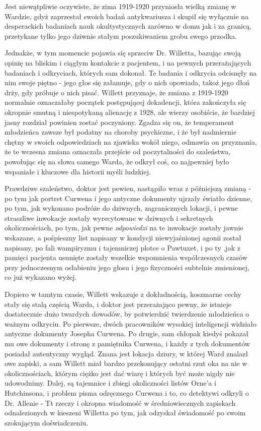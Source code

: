 Jest niewątpliwie oczywiste, że zima 1919-1920 przyniosła wielką zmianę w Wardzie, gdyż zaprzestał swoich badań antykwariusza i skupił się wyłącznie na desperackich badaniach nauk okultystycznych zarówno w domu jak i za granicą, przetykane tylko jego dziwnie stałym poszukiwaniem grobu swego przodka.

Jednakże, w tym momencie pojawia się sprzeciw Dr. Willetta, bazując swoją opinię na bliskim i ciągłym kontakcie z pacjentem, i na pewnych przerażających badaniach i odkryciach, których sam dokonał. Te badania i odkrycia odcisnęły na nim swoje piętno - jego głos się załamuje, gdy o nich opowiada, takoż jego dłoń drży, gdy próbuje o nich pisać. Willett przyznaje, że zmiana z 1919-1920 normalnie oznaczałaby początek postępującej dekadencji, która zakończyła się okropnie smutną i niespotykaną alienację z 1928, ale wierzy osobiście, że bardziej jasny rozdział powinien zostać poczyniony. Zgadza się on, że temperament młodzieńca zawsze był podatny na choroby psychiczne, i że był nadmiernie chętny w swoich odpowiedziach na zjawiska wokół niego, odmawia on przyznania, że te wczesna zmiana oznaczała przejście od poczytalności do szaleństwa, powołując się na słowa samego Warda, że odkrył coś, co najpewniej było wspaniałe i kluczowe dla historii myśli ludzkiej.

Prawdziwe szaleństwo, doktor jest pewien, nastąpiło wraz z późniejszą zmianą - po tym jak portret Curwena i jego antyczne dokumenty ujrzały światło dzienne, po tym, jak wykonano podróże do dziwnych, zagranicznych lokacji, i pewne straszliwe inwokacje zostały wyrecytowane w dziwnych i sekretnych okolicznościach, po tym, jak pewne \textit{odpowiedzi} na te inwokacje zostały jawnie wskazane, a pośpieszny list napisany w kondycji niewyjaśnionej agonii został napisany, po fali wampiryzmu i tajemniczej plotce o Pawtuxet, i po ty  ,jak z pamięci pacjenta usunięte zostały wszelkie wspomnienia współczesnych czasów  przy jednoczesnym osłabieniu jego głosu i jego fizyczności subtelnie zmienionej, co już wykazano wyżej.

Dopiero w tamtym czasie, Willett wskazuje z dokładnością, koszmarne cechy stały się stalą częścią Warda, i doktor jest przerażająco pewny, że istnieje dostatecznie dużo twardych dowodów, by potwierdzić twierdzenie młodzieńca o ważnym odkryciu. Po pierwsze, dwóch pracowników wysokiej inteligencji widziało antyczne dokumenty Josepha Curwena. Po drugie, sam chłopak kiedyś pokazał mu owe dokumenty i stronę z pamiętnika Curwena, i każdy z tych dokumentów posiadał autentyczny wygląd. Znana jest lokacja dziury, w której Ward znalazł owe zapiski, a sam Willett miał bardzo przekonujący ostatni rzut oka na nie w okolicznościach, którym ciężko jest dać wiarę i których być może nigdy nie udowodnimy. Dalej, są tajemnice i zbiegi okoliczności listów Orne'a i Hutchinsona, i problem pisma odręcznego Curwena i to, co detektywi odkryli o Dr. Allenie - Tt rzeczy i okropna wiadomość w średniowiecznych zapiskach odnalezionych w kieszeni Willetta po tym, jak odzyskał świadomość po swoim szokującym doświadczeniu.

